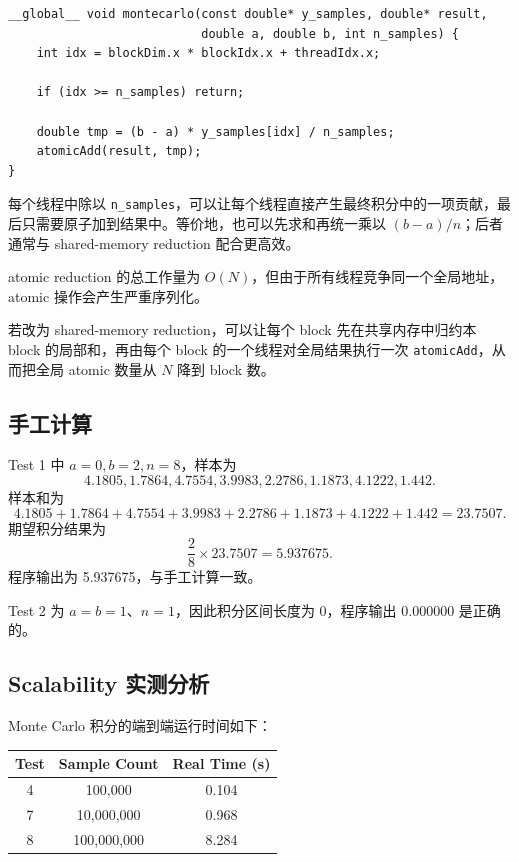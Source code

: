 \documentclass[UTF8,a4paper,12pt,fontset=none]{ctexart}
\begin{document}
\begin{lstlisting}
__global__ void montecarlo(const double* y_samples, double* result,
                           double a, double b, int n_samples) {
    int idx = blockDim.x * blockIdx.x + threadIdx.x;

    if (idx >= n_samples) return;

    double tmp = (b - a) * y_samples[idx] / n_samples;
    atomicAdd(result, tmp);
}
\end{lstlisting}

每个线程中除以 \texttt{n\_samples}，可以让每个线程直接产生最终积分中的一项贡献，最后只需要原子加到结果中。等价地，也可以先求和再统一乘以 $(b-a)/n$；后者通常与 shared-memory reduction 配合更高效。

atomic reduction 的总工作量为 $O(N)$，但由于所有线程竞争同一个全局地址，atomic 操作会产生严重序列化。

若改为 shared-memory reduction，可以让每个 block 先在共享内存中归约本 block 的局部和，再由每个 block 的一个线程对全局结果执行一次 \texttt{atomicAdd}，从而把全局 atomic 数量从 $N$ 降到 block 数。

\subsection{手工计算}

Test 1 中 $a=0,b=2,n=8$，样本为
\[
4.1805,1.7864,4.7554,3.9983,2.2786,1.1873,4.1222,1.442.
\]
样本和为
\[
  4.1805+1.7864+4.7554+3.9983+2.2786+1.1873+4.1222+1.442=23.7507.
\]
期望积分结果为
\[
  \frac{2}{8}\times23.7507=5.937675.
\]
程序输出为 5.937675，与手工计算一致。

Test 2 为 $a=b=1$、$n=1$，因此积分区间长度为 0，程序输出 0.000000 是正确的。

\subsection{Scalability 实测分析}

Monte Carlo 积分的端到端运行时间如下：

\begin{center}
\begin{tabular}{ccc}
\toprule
Test & Sample Count & Real Time (s) \\
\midrule
4 & 100,000     & 0.104 \\
7 & 10,000,000  & 0.968 \\
8 & 100,000,000 & 8.284 \\
\bottomrule
\end{tabular}
\end{center}
\end{document}

